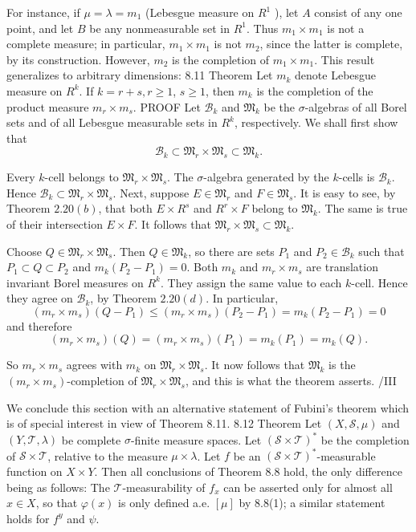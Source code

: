 For instance, if $\mu=\lambda=m_1$ (Lebesgue measure on $R^1$ ), let $A$ consist of any one point, and let $B$ be any nonmeasurable set in $R^1$. Thus $m_1 \times m_1$ is not a complete measure; in particular, $m_1 \times m_1$ is not $m_2$, since the latter is complete, by its construction. However, $m_2$ is the completion of $m_1 \times m_1$. This result generalizes to arbitrary dimensions:
8.11 Theorem Let $m_k$ denote Lebesgue measure on $R^k$. If $k=r+s, r \geq 1$, $s \geq 1$, then $m_k$ is the completion of the product measure $m_r \times m_s$.
PROOF Let $\mathscr{B}_k$ and $\mathfrak{M}_k$ be the $\sigma$-algebras of all Borel sets and of all Lebesgue measurable sets in $R^k$, respectively. We shall first show that
$$
\mathscr{B}_k \subset \mathfrak{M}_r \times \mathfrak{M}_s \subset \mathfrak{M}_k .
$$

Every $k$-cell belongs to $\mathfrak{M}_r \times \mathfrak{M}_s$. The $\sigma$-algebra generated by the $k$-cells is $\mathscr{B}_k$. Hence $\mathscr{B}_k \subset \mathfrak{M}_r \times \mathfrak{M}_s$. Next, suppose $E \in \mathfrak{M}_r$ and $F \in \mathfrak{M}_s$. It is easy to see, by Theorem $2.20(b)$, that both $E \times R^s$ and $R^r \times F$ belong to $\mathfrak{M}_k$. The same is true of their intersection $E \times F$. It follows that $\mathfrak{M}_r \times \mathfrak{M}_s \subset \mathfrak{M}_k$.

Choose $Q \in \mathfrak{M}_r \times \mathfrak{M}_s$. Then $Q \in \mathfrak{M}_k$, so there are sets $P_1$ and $P_2 \in \mathscr{B}_k$ such that $P_1 \subset Q \subset P_2$ and $m_k\left(P_2-P_1\right)=0$. Both $m_k$ and $m_r \times m_s$ are translation invariant Borel measures on $R^k$. They assign the same value to each $k$-cell. Hence they agree on $\mathscr{B}_k$, by Theorem $2.20(d)$. In particular,
$$
\left(m_r \times m_s\right)\left(Q-P_1\right) \leq\left(m_r \times m_s\right)\left(P_2-P_1\right)=m_k\left(P_2-P_1\right)=0
$$
and therefore
$$
\left(m_r \times m_s\right)(Q)=\left(m_r \times m_s\right)\left(P_1\right)=m_k\left(P_1\right)=m_k(Q) .
$$

So $m_r \times m_s$ agrees with $m_k$ on $\mathfrak{M}_r \times \mathfrak{M}_s$.
It now follows that $\mathfrak{M}_k$ is the $\left(m_r \times m_s\right)$-completion of $\mathfrak{M}_r \times \mathfrak{M}_s$, and this is what the theorem asserts.
/III

We conclude this section with an alternative statement of Fubini's theorem which is of special interest in view of Theorem 8.11.
8.12 Theorem Let $(X, \mathscr{S}, \mu)$ and $(Y, \mathscr{T}, \lambda)$ be complete $\sigma$-finite measure spaces. Let $(\mathscr{S} \times \mathscr{T})^*$ be the completion of $\mathscr{S} \times \mathscr{T}$, relative to the measure $\mu \times \lambda$. Let $f$ be an $(\mathscr{S} \times \mathscr{T})^*$-measurable function on $X \times Y$. Then all conclusions of Theorem 8.8 hold, the only difference being as follows:
The $\mathscr{T}$-measurability of $f_x$ can be asserted only for almost all $x \in X$, so that $\varphi(x)$ is only defined a.e. $[\mu]$ by 8.8(1); a similar statement holds for $f^y$ and $\psi$.


